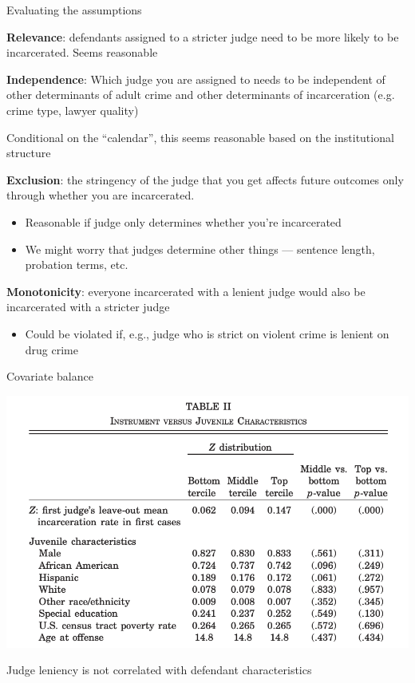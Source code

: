 \documentclass[11pt,english,handout]{beamer}
\newenvironment{wideitemize}{\itemize\addtolength{\itemsep}{10pt}}{\enditemize}
\begin{document}
\begin{frame}{Evaluating the assumptions}
	\begin{wideitemize}
		\item
		\textbf{Relevance}:\pause{} defendants assigned to a stricter judge need to be more likely to be incarcerated. \pause{} Seems reasonable
		
		\item
		\textbf{Independence}:\pause{} Which judge you are assigned to needs to be independent of other determinants of adult crime and other determinants of incarceration (e.g. crime type, lawyer quality) \pause{}
			\begin{wideitemize}
				\item
				Conditional on the ``calendar'', this seems reasonable based on the institutional structure
			\end{wideitemize}
		
		\item
		\textbf{Exclusion}: \pause the stringency of the judge that you get affects future outcomes only through whether you are incarcerated.
			\begin{itemize}
				\item 
				Reasonable if judge only determines whether you're incarcerated
				
				\item
				We might worry that judges determine other things --- sentence length, probation terms, etc.
			\end{itemize}
		
		\item
		\textbf{Monotonicity}:\pause{} everyone incarcerated with a lenient judge would also be incarcerated with a stricter judge \pause
			\begin{itemize}
				\item
				Could be violated if, e.g., judge who is strict on violent crime is lenient on drug crime 
			\end{itemize}
	\end{wideitemize}
\end{frame}

\begin{frame}{Covariate balance}
	\begin{center}
	\includegraphics[width = 0.7 \linewidth]{balance}
	\end{center}
Judge leniency is not correlated with defendant characteristics
\end{frame}
\end{document}
